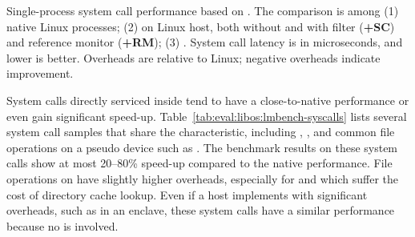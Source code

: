 \label{sec:eval:libos:syscalls}


\begin{table}[t!b!]

\caption{Single-process system call performance based on \lmbench{}. The comparison is among (1) native Linux processes; (2) \graphene{} on Linux host, both without and with \seccomp{} filter ({\bf +SC}) and reference monitor ({\bf +RM}); (3) \graphenesgx{}.
System call latency is in microseconds, and lower is better.
Overheads are relative to Linux; negative overheads indicate improvement.} 
\label{tab:eval:libos:lmbench-syscalls}
\end{table}


System calls directly serviced
inside \thelibos{}
tend to have a close-to-native performance
or even gain significant speed-up.
Table~\ref{tab:eval:libos:lmbench-syscalls}
lists several system call samples that share the characteristic,
including ,
, and common file operations on a pseudo device such as .
The benchmark results on these system calls
show at most 20--80\% speed-up
compared to the native performance.
File operations on  have
slightly higher overheads,
especially for  and 
which suffer the cost
of directory cache lookup.
Even if a host implements \thehostabi{} with significant overheads,
such as in an \sgx{} enclave,
these system calls have a similar performance because no \hostapi{} is involved.









